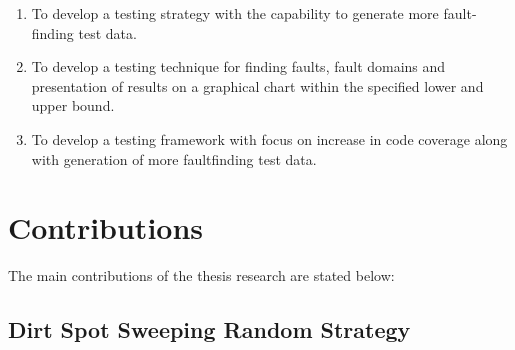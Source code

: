 \begin{enumerate}
\item To develop a testing strategy with the capability to generate more fault-finding test data.

\item To develop a testing technique for finding faults, fault domains and presentation of results on a graphical chart within the specified lower and upper bound. 

\item To develop a testing framework with focus on increase in code coverage along with generation of more faultfinding test data. 

\end{enumerate}

\section{Contributions}
The main contributions of the thesis research are stated below: 

\subsection{Dirt Spot Sweeping Random Strategy}

